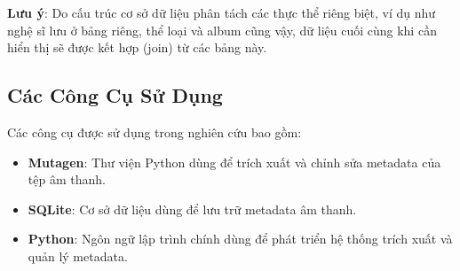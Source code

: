 \documentclass[conference]{IEEEtran}
\begin{document}
\textbf{Lưu ý}: Do cấu trúc cơ sở dữ liệu phân tách các thực thể riêng biệt, ví dụ như nghệ sĩ lưu ở bảng riêng, thể loại và album cũng vậy, dữ liệu cuối cùng khi cần hiển thị sẽ được kết hợp (join) từ các bảng này.


\subsection{Các Công Cụ Sử Dụng}
Các công cụ được sử dụng trong nghiên cứu bao gồm:

\begin{itemize}
    \item \textbf{Mutagen}: Thư viện Python dùng để trích xuất và chỉnh sửa metadata của tệp âm thanh.
    \item \textbf{SQLite}: Cơ sở dữ liệu dùng để lưu trữ metadata âm thanh.
    \item \textbf{Python}: Ngôn ngữ lập trình chính dùng để phát triển hệ thống trích xuất và quản lý metadata.
\end{itemize}
\end{document}
